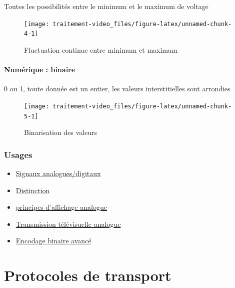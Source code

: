 \documentclass[
  french,
]{book}
\providecommand{\tightlist}{%
  \setlength{\itemsep}{0pt}\setlength{\parskip}{0pt}}
\begin{document}
Toutes les possibilités entre le minimum et le maximum de voltage

\begin{figure}

{\centering \texttt{[image: traitement-video\_files/figure-latex/unnamed-chunk-4-1]} 

}

\caption{Fluctuation continue entre minimum et maximum}\label{fig:unnamed-chunk-4}
\end{figure}

\hypertarget{numuxe9rique-binaire}{%
\paragraph{Numérique : binaire}\label{numuxe9rique-binaire}}

0 ou 1, toute donnée est un entier, les valeurs interstitielles sont arrondies

\begin{figure}

{\centering \texttt{[image: traitement-video\_files/figure-latex/unnamed-chunk-5-1]} 

}

\caption{Binarisation des valeurs}\label{fig:unnamed-chunk-5}
\end{figure}

\hypertarget{usages}{%
\subsubsection{Usages}\label{usages}}

\begin{itemize}
\tightlist
\item
  \href{https://en.wikipedia.org/wiki/Video\#Analog_video}{Signaux analogues/digitaux}
\item
  \href{http://what-when-how.com/display-interfaces/basics-of-analog-and-digital-display-interfaces-part-1/}{Distinction}
\item
  \href{http://what-when-how.com/display-interfaces/basic-concepts-in-display-systems-part-1/}{principes d'affichage analogue}
\item
  \href{https://en.wikipedia.org/wiki/Analog_television}{Transmission télévisuelle analogue}
\item
  \href{https://github.com/sebpiq/cours-son-reseaux/blob/main/data-encodage.md}{Encodage binaire avancé}
\end{itemize}

\hypertarget{protocoles-de-transport}{%
\section{Protocoles de transport}\label{protocoles-de-transport}}
\end{document}
